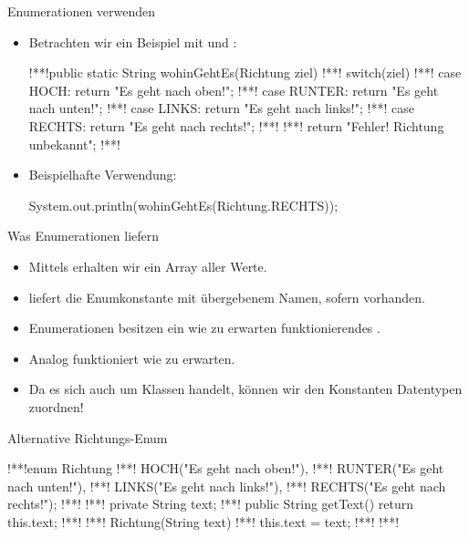 \begin{frame}[fragile]{Enumerationen verwenden}
    \begin{itemize}[<+(1)->]
        \widei
        \item Betrachten wir ein Beispiel mit  und :\pause{}
\begin{plainjava}
!**!public static String wohinGehtEs(Richtung ziel){
!**!    switch(ziel) {
!**!        case HOCH:   return "Es geht nach oben!";
!**!        case RUNTER: return "Es geht nach unten!";
!**!        case LINKS:  return "Es geht nach links!";
!**!        case RECHTS: return "Es geht nach rechts!";
!**!    }
!**!    return "Fehler! Richtung unbekannt";
!**!}
\end{plainjava}
    \item<10-> Beispielhafte Verwendung:
\begin{plainjava}
System.out.println(wohinGehtEs(Richtung.RECHTS));
\end{plainjava}
    \end{itemize}
\end{frame}

\begin{frame}[fragile]{Was Enumerationen liefern}
    \begin{itemize}[<+(1)->]
        \widei
        \item Mittels  erhalten wir ein Array aller Werte.
        \item {} liefert die Enumkonstante mit übergebenem Namen,\pause{} sofern vorhanden.
        \item Enumerationen besitzen ein wie zu erwarten funktionierendes .
        \item Analog funktioniert  wie zu erwarten.
        \item Da es sich auch um Klassen handelt, können wir den Konstanten Datentypen zuordnen!
    \end{itemize}
\end{frame}

\begin{frame}[fragile,c]{Alternative Richtungs-Enum}
\begin{plainjava}
!**!enum Richtung {
!**!    HOCH("Es geht nach oben!"),
!**!    RUNTER("Es geht nach unten!"),
!**!    LINKS("Es geht nach links!"),
!**!    RECHTS("Es geht nach rechts!");
!**!
!**!    private String text;
!**!    public String getText() { return this.text; }
!**!
!**!    Richtung(String text) {
!**!        this.text = text;
!**!    }
!**!}
\end{plainjava}
\end{frame}

